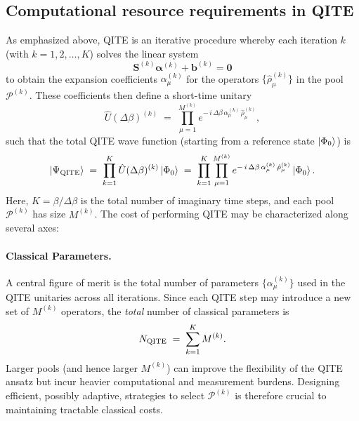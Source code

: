 \documentclass[aip,jcp,amsmath,amssymb, reprint]{revtex4-1}
\begin{document}
\subsection{Computational resource requirements in QITE}
\label{sec:computational_req}

As emphasized above, QITE is an iterative procedure whereby each iteration $k$ (with $k=1,2,\dots,K$) solves the linear system 
\begin{equation}
\label{eq:lin_sys_rep}
\mathbf{S}^{(k)} \boldsymbol{\alpha}^{(k)} + \mathbf{b}^{(k)} = \mathbf{0}
\end{equation}
to obtain the expansion coefficients $\alpha_\mu^{(k)}$ for the operators $\{\hat{\rho}_\mu^{(k)}\}$ in the pool $\mathcal{P}^{(k)}$. These coefficients then define a short-time unitary
\begin{equation}
\hat{U}(\Delta \beta)^{(k)} 
\;=\;
\prod_{\mu=1}^{M^{(k)}}
e^{-\,i \,\Delta \beta\,\alpha_\mu^{(k)} \,\hat{\rho}_\mu^{(k)}},
\end{equation}
such that the total QITE wave function (starting from a reference state $\ket{\Phi_0}$) is
\begin{equation}
\ket{\Psi_{\rm{QITE}}} 
\;=\;
\prod_{k=1}^{K}
\hat{U}(\Delta \beta)^{(k)} 
\ket{\Phi_0}
\;=\;
\prod_{k=1}^K
\prod_{\mu=1}^{M^{(k)}}
e^{-\,i\,\Delta \beta\,\alpha_\mu^{(k)} \,\hat{\rho}_\mu^{(k)}}
\ket{\Phi_0}.
\end{equation}
Here, $K = \beta/\Delta \beta$ is the total number of imaginary time steps, and each pool $\mathcal{P}^{(k)}$ has size $M^{(k)}$. The cost of performing QITE may be characterized along several axes:

\paragraph{Classical Parameters.}
A central figure of merit is the total number of parameters $\{\alpha_\mu^{(k)}\}$ used in the QITE unitaries across all iterations. Since each QITE step may introduce a new set of $M^{(k)}$ operators, the \textit{total} number of classical parameters is
\begin{equation}
N_{\rm{QITE}} 
\;=\;
\sum_{k=1}^{K} 
M^{(k)}.
\end{equation}
Larger pools (and hence larger $M^{(k)}$) can improve the flexibility of the QITE ansatz but incur heavier computational and measurement burdens. Designing efficient, possibly adaptive, strategies to select $\mathcal{P}^{(k)}$ is therefore crucial to maintaining tractable classical costs.
\end{document}
